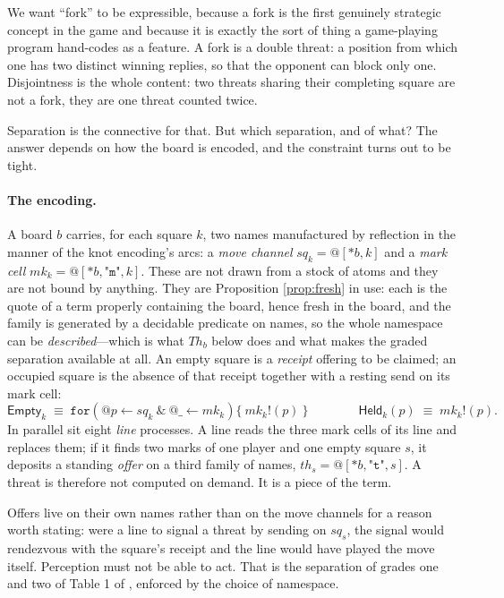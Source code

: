 \documentclass[11pt]{article}
\theoremstyle{definition}
\theoremstyle{plain}
\theoremstyle{remark}
\begin{document}
We want ``fork'' to be expressible, because a fork is the first genuinely
strategic concept in the game and because it is exactly the sort of thing a
game-playing program hand-codes as a feature. A fork is a double threat: a
position from which one has two distinct winning replies, so that the opponent
can block only one. Disjointness is the whole content: two threats sharing their
completing square are not a fork, they are one threat counted twice.

Separation is the connective for that. But which separation, and of what? The
answer depends on how the board is encoded, and the constraint turns out to be
tight.

\paragraph{The encoding.} A board $b$ carries, for each square $k$, two names
manufactured by reflection in the manner of the knot encoding's arcs: a
\emph{move channel} $\mathit{sq}_k = @[*b,k]$ and a \emph{mark cell}
$\mathit{mk}_k = @[*b,\texttt{"m"},k]$. These are not drawn from a stock of
atoms and they are not bound by anything. They are Proposition \ref{prop:fresh}
in use: each is the quote of a term properly containing the board, hence fresh
in the board, and the family is generated by a decidable predicate on names, so
the whole namespace can be \emph{described}---which is what
$\mathit{Th}_b$ below does and what makes the graded separation available at
all. An empty square is a \emph{receipt} offering to be
claimed; an occupied square is the absence of that receipt together with a
resting send on its mark cell:
\[
\mathsf{Empty}_k \;\equiv\; \texttt{for}(@p \leftarrow \mathit{sq}_k\ \&\ @\_
\leftarrow \mathit{mk}_k)\{\ \mathit{mk}_k!(p)\ \}
\qquad\qquad
\mathsf{Held}_k(p) \;\equiv\; \mathit{mk}_k!(p) .
\]
In parallel sit eight \emph{line} processes. A line reads the three mark cells
of its line and replaces them; if it finds two marks of one player and one empty
square $s$, it deposits a standing \emph{offer} on a third family of names,
$\mathit{th}_s = @[*b,\texttt{"t"},s]$. A threat is therefore not computed on
demand. It is a piece of the term.

Offers live on their own names rather than on the move channels for a reason
worth stating: were a line to signal a threat by sending on $\mathit{sq}_s$, the
signal would rendezvous with the square's receipt and the line would have played
the move itself. Perception must not be able to act. That is the separation of
grades one and two of Table 1 of \cite{scientist}, enforced by the choice of
namespace.
\end{document}
